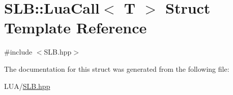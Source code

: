 \hypertarget{structSLB_1_1LuaCall}{}\section{S\+LB\+:\+:Lua\+Call$<$ T $>$ Struct Template Reference}
\label{structSLB_1_1LuaCall}


{\ttfamily \#include $<$S\+L\+B.\+hpp$>$}



The documentation for this struct was generated from the following file\+:\begin{DoxyCompactItemize}
\item 
L\+U\+A/\hyperlink{SLB_8hpp}{S\+L\+B.\+hpp}\end{DoxyCompactItemize}
